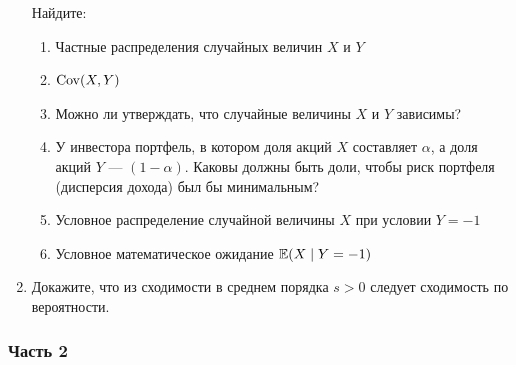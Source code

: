 \documentclass[12pt, a4paper]{article}\usepackage[]{graphicx}\usepackage[]{color}
\begin{document}
\begin{enumerate}
					Найдите:
					\begin{enumerate}
						\item Частные распределения случайных величин $X$ и $Y$
						\item $\operatorname{Cov}(X,Y)$
						\item Можно ли утверждать, что случайные величины $X$ и $Y$ зависимы?
						\item У инвестора портфель, в котором доля акций $X$ составляет $
						\alpha$, а доля акций $Y$ — $(1-\alpha)$. Каковы должны быть доли, чтобы риск портфеля (дисперсия дохода) был бы минимальным?
						\item Условное распределение случайной величины $X$ при условии $Y=-1$
						\item Условное математическое ожидание $\mathbb{E}(X\mid Y=-1)$
					\end{enumerate}

					\item Докажите, что из сходимости в среднем порядка $s>0$ следует сходимость по вероятности.

				\end{enumerate}


				\subsubsection*{Часть 2}
\end{document}
